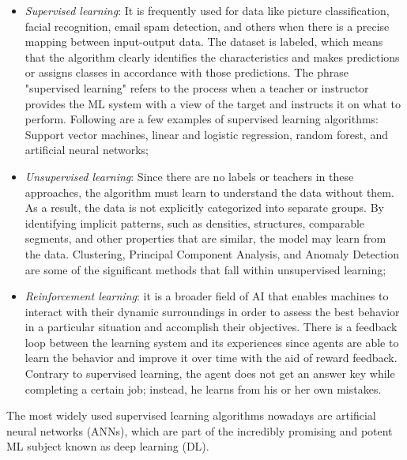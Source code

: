 \begin{itemize}
    \item \textit{Supervised learning}: It is frequently used for data like picture classification, facial recognition, email spam detection, and others when there is a precise mapping between input-output data. The dataset is labeled, which means that the algorithm clearly identifies the characteristics and makes predictions or assigns classes in accordance with those predictions. The phrase "supervised learning" refers to the process when a teacher or instructor provides the ML system with a view of the target and instructs it on what to perform. Following are a few examples of supervised learning algorithms: Support vector machines, linear and logistic regression, random forest, and artificial neural networks;
    \item \textit{Unsupervised learning}: Since there are no labels or teachers in these approaches, the algorithm must learn to understand the data without them. As a result, the data is not explicitly categorized into separate groups. By identifying implicit patterns, such as densities, structures, comparable segments, and other properties that are similar, the model may learn from the data. Clustering, Principal Component Analysis, and Anomaly Detection are some of the significant methods that fall within unsupervised learning;
    \item \textit{Reinforcement learning}: it is a broader field of AI that enables machines to interact with their dynamic surroundings in order to assess the best behavior in a particular situation and accomplish their objectives. There is a feedback loop between the learning system and its experiences since agents are able to learn the behavior and improve it over time with the aid of reward feedback. Contrary to supervised learning, the agent does not get an answer key while completing a certain job; instead, he learns from his or her own mistakes.
\end{itemize}

The most widely used supervised learning algorithms nowadays are artificial neural networks (ANNs), which are part of the incredibly promising and potent ML subject known as deep learning (DL).

